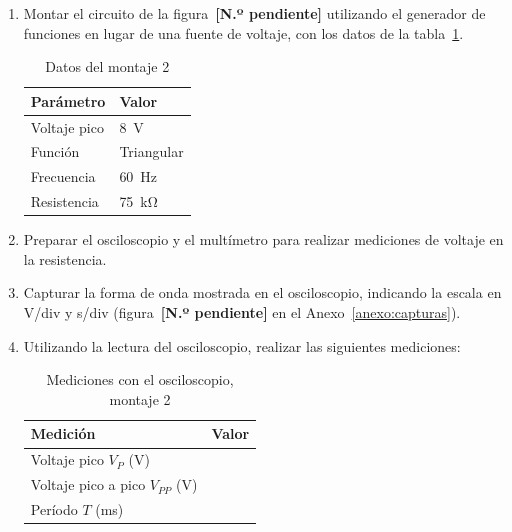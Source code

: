 \documentclass{article}
\newcommand{\vacio}[1][2cm]{\underline{\hspace{#1}}}
\newcommand{\figpend}{figura~\textbf{[N.º pendiente]}}
\begin{document}
    \begin{enumerate}
        \item Montar el circuito de la \figpend{} utilizando el generador de funciones en lugar de una fuente de voltaje, con los datos de la tabla~\ref{tab:m2}.

        \begin{table}[ht!]
            \centering
            \begin{tabular}{ll}
                \toprule
                Parámetro      & Valor                      \\
                \midrule
                Voltaje pico   & \SI{8}{\volt}              \\
                Función        & Triangular                 \\
                Frecuencia     & \SI{60}{\hertz}            \\
                Resistencia    & \SI{75}{\kilo\ohm}         \\
                \bottomrule
            \end{tabular}
            \caption{Datos del montaje 2}\label{tab:m2}
        \end{table}

        \item Preparar el osciloscopio y el multímetro para realizar mediciones de voltaje en la resistencia.

        \item Capturar la forma de onda mostrada en el osciloscopio, indicando la escala en V/div y s/div (\figpend{} en el Anexo~\ref{anexo:capturas}).

        \item Utilizando la lectura del osciloscopio, realizar las siguientes mediciones:

        \begin{table}[ht!]
            \centering
            \begin{tabular}{lc}
                \toprule
                Medición                         & Valor  \\
                \midrule
                Voltaje pico $V_P$ (V)           & \vacio \\
                Voltaje pico a pico $V_{PP}$ (V) & \vacio \\
                Período $T$ (ms)                 & \vacio \\
                \bottomrule
            \end{tabular}
            \caption{Mediciones con el osciloscopio, montaje 2}\label{tab:osc-m2}
        \end{table}


\end{enumerate}
\end{document}
